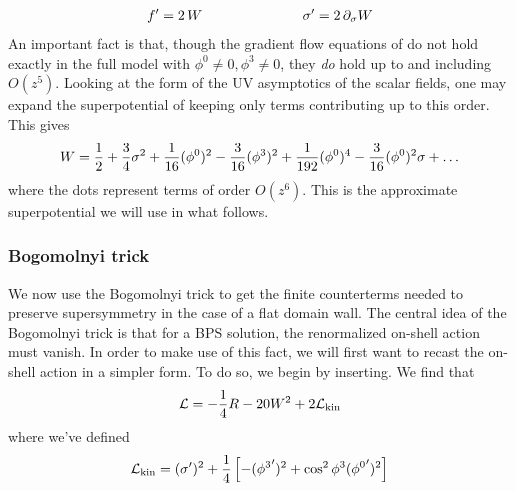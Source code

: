 \documentclass[12pt]{article}
\begin{document}
\begin{eqnarray}
f'=2\,W\hspace{1 in} \sigma'=2 \,\partial_\sigma W
\end{eqnarray}
An important fact is that, though the gradient flow equations of do not hold exactly in the full model with $\phi^0\ne0,\phi^3\ne0$, they \textit{do} hold up to and including $O(z^5)$. Looking at the form of the UV asymptotics of the scalar fields, one may expand the superpotential of keeping only terms contributing up to this order. This gives 
\begin{eqnarray}
W =  {1\over 2} + {3 \over 4} \sigma^2 + {1 \over 16} (\phi^0)^2 -{3 \over 16} (\phi^3)^2 + {1 \over 192} (\phi^0)^4 -{3 \over 16} (\phi^0)^2 \sigma + \dots
\end{eqnarray}
where the dots represent terms of order $O(z^6)$. This is the approximate superpotential we will use in what follows.
\subsubsection{Bogomolnyi trick}
We now use the Bogomolnyi trick  to get the finite counterterms needed to preserve supersymmetry in the case of a flat domain wall. The central idea of the Bogomolnyi trick is that for a BPS solution, the renormalized on-shell action must vanish. In order to make use of this fact, we will first want to recast the on-shell action in a simpler form.
To do so, we begin by inserting. We find that 
\begin{eqnarray}
{\cal L} =- {1 \over 4}R -20 W^2 + 2 {\cal L}_{\mathrm{kin}}
\end{eqnarray}
where we've defined 
\begin{eqnarray}
{\cal L}_{\mathrm{kin}} = (\sigma')^2 + {1 \over 4}\left[-({\phi^3}')^2 + \cos^2 \phi^3 ({\phi^0}')^2\right]
\end{eqnarray}
\end{document}
